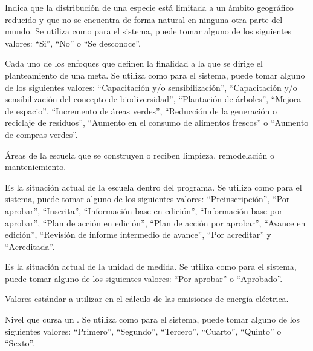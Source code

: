 \begin{description}
     Indica que la distribución de una especie está limitada a un ámbito geográfico reducido y que no se encuentra de forma natural en ninguna otra parte del mundo. Se utiliza como  para el sistema, puede tomar alguno de los siguientes valores: ``Si'', ``No'' o ``Se desconoce''.

     Cada uno de los enfoques que definen la finalidad a la que se dirige el planteamiento de una meta. Se utiliza como  para el sistema, puede tomar alguno de los siguientes valores: ``Capacitación y/o sensibilización'', ``Capacitación y/o sensibilización del concepto de biodiversidad'', ``Plantación de árboles'', ``Mejora de espacio'', ``Incremento de áreas verdes'', ``Reducción de la generación o reciclaje de residuos'', ``Aumento en el consumo de alimentos frescos'' o ``Aumento de compras verdes''.
    
     Áreas de la escuela que se construyen o reciben limpieza, remodelación o manteniemiento.
    
     Es la situación actual de la escuela dentro del programa. Se utiliza como  para el sistema, puede tomar alguno de los siguientes valores: ``Preinscripción'', ``Por aprobar'', ``Inscrita'', ``Información base en edición'', ``Información base por aprobar'', ``Plan de acción en edición'', ``Plan de acción por aprobar'', ``Avance en edición'', ``Revisión de informe intermedio de avance'', ``Por acreditar'' y ``Acreditada''.

     Es la situación actual de la unidad de medida. Se utiliza como  para el sistema, puede tomar alguno de los siguientes valores: ``Por aprobar'' o ``Aprobado''.
    
     Valores estándar a utilizar en el cálculo de las emisiones de energía eléctrica. 
    

     Nivel que cursa un . Se utiliza como  para el sistema, puede tomar alguno de los siguientes valores: ``Primero'', ``Segundo'', ``Tercero'', ``Cuarto'', ``Quinto'' o ``Sexto''.
    

\end{description}
